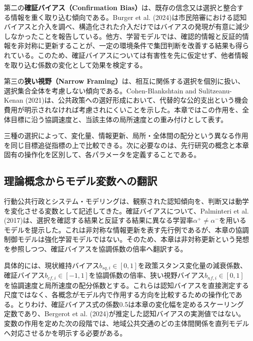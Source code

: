 第二の\textbf{確証バイアス（Confirmation Bias）}は、既存の信念又は選択と整合する情報を重く取り込む傾向である。Burger et al. (2024)は市民陪審における認知バイアスと介入を調べ、構造化された介入だけではバイアスの発現が有意に減少しなかったことを報告している\cite{burger2024bias}。他方、学習モデルでは、確認的情報と反証的情報を非対称に更新することが、一定の環境条件で集団判断を改善する結果も得られている\cite{bergerot2024moderate}。このため、確証バイアスについては有害性を先に仮定せず、他者情報を取り込む係数の変化として効果を検定する。

第三の\textbf{狭い視野（Narrow Framing）}は、相互に関係する選択を個別に扱い、選択集合全体を考慮しない傾向である\cite{kahneman2011thinking}。Cohen-Blankshtain and Sulitzeanu-Kenan (2021)は、公共政策への選好形成において、代替的な公的支出という機会費用が明示されなければ考慮されにくいことを示した\cite{cohen2021foregone}。本章ではこの作用を、全体目標に沿う協調速度と、当該主体の局所速度との重み付けとして表す。

三種の選択によって、変化量、情報更新、局所・全体間の配分という異なる作用を同じ目標追従指標の上で比較できる。次に必要なのは、先行研究の概念と本章固有の操作化を区別して、各パラメータを定義することである。

\subsection{理論概念からモデル変数への翻訳}

行動公共行政とシステム・モデリングは、観察された認知傾向を、判断又は動学を変化させる変数として記述してきた\cite{grimmelikhuijsen2017behavioral, sterman2000business}。確証バイアスについて、Palminteri et al. (2017)は、選択を確認する結果と反証する結果に異なる学習率$\alpha^+ \neq \alpha^-$を用いるモデルを提示した\cite{palminteri2017confirmation}。これは非対称な情報更新を表す先行例であるが、本章の協調制御モデルは強化学習モデルではない。そのため、本章は非対称更新という発想を参照しつつ、確証バイアスを協調係数の倍率へ翻訳する。

具体的には、現状維持バイアス$b_{sq,i} \in [0,1]$を政策スタンス変化量の減衰係数、確証バイアス$b_{cf,i} \in [-1,1]$を協調係数の倍率、狭い視野バイアス$b_{nf,i} \in [0,1]$を協調速度と局所速度の配分係数とする。これらは認知バイアスを直接測定する尺度ではなく、各概念がモデル内で作用する方向を比較するための操作化である。とりわけ、確証バイアス式の係数0.5は本章の変化幅を定めるスケーリング定数であり、Bergerot et al. (2024)が推定した認知バイアスの実測値ではない\cite{bergerot2024moderate}。変数の作用を定めた次の段階では、地域公共交通のどの主体間関係を直列モデルへ対応させるかを明示する必要がある。

